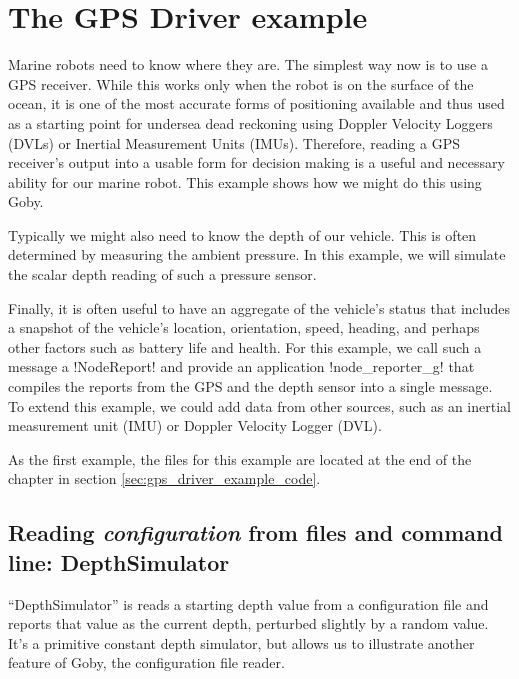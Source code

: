 \chapter{The GPS Driver example}
\MakeShortVerb{\!} %

Marine robots need to know where they are. The simplest way now is to use a GPS receiver. While this works only when the robot is on the surface of the ocean, it is one of the most accurate forms of positioning available and thus used as a starting point for undersea dead reckoning using Doppler Velocity Loggers (DVLs) or Inertial Measurement Units (IMUs). Therefore, reading a GPS receiver's output into a usable form for decision making is a useful and necessary ability for our marine robot. This example shows how we might do this using Goby.

Typically we might also need to know the depth of our vehicle. This is often determined by measuring the ambient pressure. In this example, we will simulate the scalar depth reading of such a pressure sensor.

Finally, it is often useful to have an aggregate of the vehicle's status that includes a snapshot of the vehicle's location, orientation, speed, heading, and perhaps other factors such as battery life and health. For this example, we call such a message a !NodeReport! and provide an application !node_reporter_g! that compiles the reports from the GPS and the depth sensor into a single message. To extend this example, we could add data from other sources, such as an inertial measurement unit (IMU) or Doppler Velocity Logger (DVL).

As the first example, the files for this example are located at the end of the chapter in section \ref{sec:gps_driver_example_code}.

\section{Reading \textit{configuration} from files and command line: DepthSimulator}

``DepthSimulator'' is reads a starting depth value from a configuration file and reports that value as the current depth, perturbed slightly by a random value. It's a primitive constant depth simulator, but allows us to illustrate another feature of Goby, the configuration file reader.

